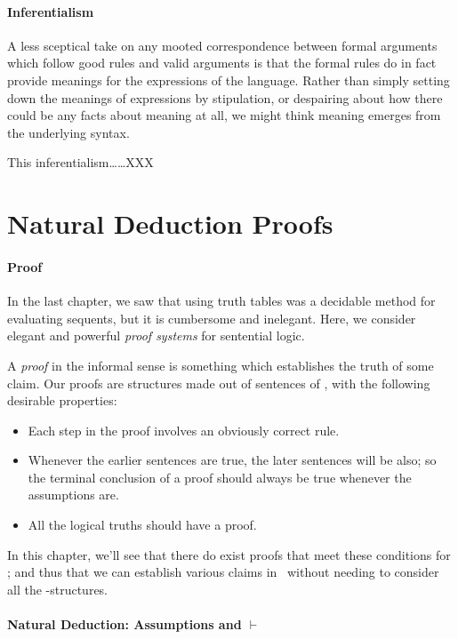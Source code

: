 

\paragraph{Inferentialism}

A less sceptical take on any mooted correspondence between formal arguments which follow good rules and valid arguments is that the formal rules do in fact provide meanings for the expressions of the language. Rather than simply setting down the meanings of expressions by stipulation, or despairing about how there could be any facts about meaning at all, we might think meaning emerges from the underlying syntax.

This inferentialism……XXX



\section{Natural Deduction Proofs}
\paragraph{Proof}

In the last chapter, we saw that using truth tables was a decidable method for evaluating sequents, but it is cumbersome and inelegant. Here, we consider elegant and powerful \emph{proof systems} for sentential logic.

A \emph{proof} in the informal sense is something which establishes the truth of some claim. Our proofs are structures made out of sentences of \lone, with the following desirable properties: \begin{itemize}
	\item Each step in the proof involves an obviously correct rule.
	\item Whenever the earlier sentences are true, the later sentences will be also; so the terminal conclusion of a proof should always be true whenever the assumptions are.
	\item All the logical truths should have a proof.
\end{itemize}

In this chapter, we'll see that there do exist proofs that meet these conditions for \lone; and thus that we can establish various claims in \lone\ without needing to consider all the \lone-structures.

\paragraph{Natural Deduction: Assumptions and $\vdash$}

